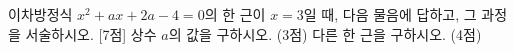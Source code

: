 이차방정식 $x^2+ax+2a-4=0$의 한 근이 $x=3$일 때, 다음 물음에 답하고, 그 과정을 서술하시오.  \mbox{[7점]}
 상수 $a$의 값을 구하시오. (3점)
 다른 한 근을 구하시오. (4점)
